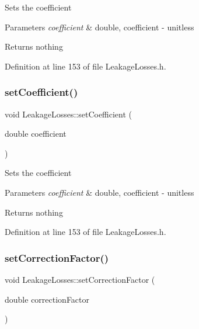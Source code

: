 Sets the coefficient


\begin{DoxyParams}{Parameters}
{\em coefficient} & double, coefficient -\/ unitless\\
\hline
\end{DoxyParams}
\begin{DoxyReturn}{Returns}
nothing 
\end{DoxyReturn}


Definition at line 153 of file Leakage\+Losses.\+h.

\mbox{\label{class_leakage_losses_add2e96e75b6dd965370340dc03717434}} 
\subsubsection{\texorpdfstring{set\+Coefficient()}{setCoefficient()}\hspace{0.1cm}{\footnotesize\ttfamily [3/3]}}
{\footnotesize\ttfamily void Leakage\+Losses\+::set\+Coefficient (\begin{DoxyParamCaption}\item[{double}]{coefficient }\end{DoxyParamCaption})\hspace{0.3cm}{\ttfamily [inline]}}

Sets the coefficient


\begin{DoxyParams}{Parameters}
{\em coefficient} & double, coefficient -\/ unitless\\
\hline
\end{DoxyParams}
\begin{DoxyReturn}{Returns}
nothing 
\end{DoxyReturn}


Definition at line 153 of file Leakage\+Losses.\+h.

\mbox{\label{class_leakage_losses_a1af53750d5d9573dffa8674b3479e8d6}} 
\subsubsection{\texorpdfstring{set\+Correction\+Factor()}{setCorrectionFactor()}\hspace{0.1cm}{\footnotesize\ttfamily [1/3]}}
{\footnotesize\ttfamily void Leakage\+Losses\+::set\+Correction\+Factor (\begin{DoxyParamCaption}\item[{double}]{correction\+Factor }\end{DoxyParamCaption})\hspace{0.3cm}{\ttfamily [inline]}}

